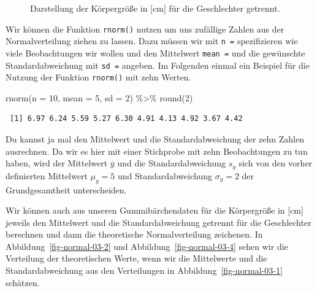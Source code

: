 \documentclass[
  letterpaper,
]{scrbook}
\newenvironment{Shaded}{\begin{snugshade}}{\end{snugshade}}
\newcommand{\AttributeTok}[1]{\textcolor[rgb]{0.40,0.45,0.13}{#1}}
\newcommand{\DecValTok}[1]{\textcolor[rgb]{0.68,0.00,0.00}{#1}}
\newcommand{\FunctionTok}[1]{\textcolor[rgb]{0.28,0.35,0.67}{#1}}
\newcommand{\NormalTok}[1]{\textcolor[rgb]{0.00,0.23,0.31}{#1}}
\newcommand{\SpecialCharTok}[1]{\textcolor[rgb]{0.37,0.37,0.37}{#1}}
\begin{document}
\begin{figure}
\begin{minipage}[t]{0.50\linewidth}
{{}

}

\end{minipage}%

\caption{\label{fig-normal-01}Darstellung der Körpergröße in {[}cm{]}
für die Geschlechter getrennt.}

\end{figure}

Wir können die Funktion \texttt{rnorm()} nutzen um uns zufällige Zahlen
aus der Normalverteilung ziehen zu lassen. Dazu müssen wir mit
\texttt{n\ =} spezifizieren wie viele Beobachtungen wir wollen und den
Mittelwert \texttt{mean\ =} und die gewünschte Standardabweichung mit
\texttt{sd\ =} angeben. Im Folgenden einmal ein Beispiel für die Nutzung
der Funktion \texttt{rnorm()} mit zehn Werten.

\begin{Shaded}
\begin{Highlighting}[]
\FunctionTok{rnorm}\NormalTok{(}\AttributeTok{n =} \DecValTok{10}\NormalTok{, }\AttributeTok{mean =} \DecValTok{5}\NormalTok{, }\AttributeTok{sd =} \DecValTok{2}\NormalTok{) }\SpecialCharTok{\%\textgreater{}\%} \FunctionTok{round}\NormalTok{(}\DecValTok{2}\NormalTok{)}
\end{Highlighting}
\end{Shaded}

\begin{verbatim}
 [1] 6.97 6.24 5.59 5.27 6.30 4.91 4.13 4.92 3.67 4.42
\end{verbatim}

Du kannst ja mal den Mittelwert und die Standardabweichung der zehn
Zahlen ausrechnen. Da wir es hier mit einer Stichprobe mit zehn
Beobachtungen zu tun haben, wird der Mittelwert \(\bar{y}\) und die
Standardabweichung \(s_y\) sich von den vorher definierten Mittelwert
\(\mu_y = 5\) und Standardabweichung \(\sigma_y = 2\) der
Grundgesamtheit unterscheiden.

Wir können auch aus unseren Gummibärchendaten für die Körpergröße in
{[}cm{]} jeweils den Mittelwert und die Standardabweichung getrennt für
die Geschlechter berechnen und dann die theoretische Normalverteilung
zeichenen. In Abbildung~\ref{fig-normal-03-2} und
Abbildung~\ref{fig-normal-03-4} sehen wir die Verteilung der
theoretischen Werte, wenn wir die Mittelwerte und die Standardabweichung
aus den Verteilungen in Abbildung~\ref{fig-normal-03-1} schätzen.
\end{document}
